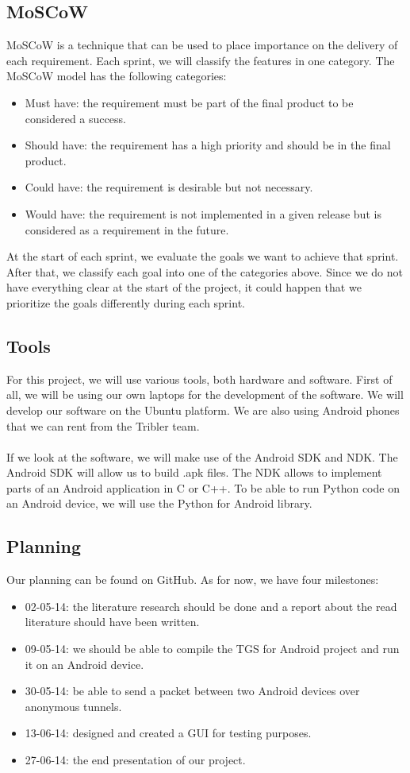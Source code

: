 \subsection{MoSCoW}
MoSCoW is a technique that can be used to place importance on the delivery of each requirement. Each sprint, we will classify the features in one category. The MoSCoW model has the following categories:
\begin{itemize}
\item Must have: the requirement must be part of the final product to be considered a success.
\item Should have: the requirement has a high priority and should be in the final product.
\item Could have: the requirement is desirable but not necessary.
\item Would have: the requirement is not implemented in a given release but is considered as a requirement in the future.
\end{itemize}
At the start of each sprint, we evaluate the goals we want to achieve that sprint. After that, we classify each goal into one of the categories above. Since we do not have everything clear at the start of the project, it could happen that we prioritize the goals differently during each sprint.

\subsection{Tools}
For this project, we will use various tools, both hardware and software. First of all, we will be using our own laptops for the development of the software. We will develop our software on the Ubuntu platform. We are also using Android phones that we can rent from the Tribler team.\\\\
If we look at the software, we will make use of the Android SDK and NDK. The Android SDK will allow us to build .apk files. The NDK allows to implement parts of an Android application in C or C++. To be able to run Python code on an Android device, we will use the Python for Android library.

\subsection{Planning}
Our planning can be found on GitHub. As for now, we have four milestones:
\begin{itemize}
\item 02-05-14: the literature research should be done and a report about the read literature should have been written.
\item 09-05-14: we should be able to compile the TGS for Android project and run it on an Android device.
\item 30-05-14: be able to send a packet between two Android devices over anonymous tunnels.
\item 13-06-14: designed and created a GUI for testing purposes.
\item 27-06-14: the end presentation of our project.
\end{itemize}

